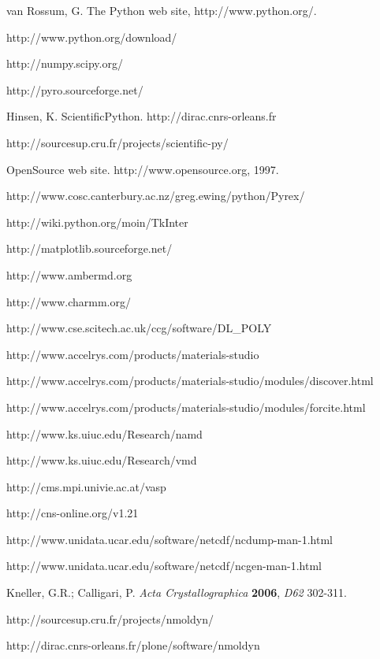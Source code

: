 \documentclass[a4paper,11pt]{article}
\begin{document}
\begin{thebibliography}{99}
 van Rossum, G. The Python web site, http://www.python.org/.

 http://www.python.org/download/

 http://numpy.scipy.org/

 http://pyro.sourceforge.net/

 Hinsen, K. ScientificPython. http://dirac.cnrs-orleans.fr  

 http://sourcesup.cru.fr/projects/scientific-py/

 OpenSource web site. http://www.opensource.org, 1997.

 http://www.cosc.canterbury.ac.nz/greg.ewing/python/Pyrex/

 http://wiki.python.org/moin/TkInter

 http://matplotlib.sourceforge.net/

 http://www.ambermd.org

 http://www.charmm.org/

 http://www.cse.scitech.ac.uk/ccg/software/DL\_POLY

 http://www.accelrys.com/products/materials-studio

 http://www.accelrys.com/products/materials-studio/modules/discover.html

 http://www.accelrys.com/products/materials-studio/modules/forcite.html

 http://www.ks.uiuc.edu/Research/namd

 http://www.ks.uiuc.edu/Research/vmd

 http://cms.mpi.univie.ac.at/vasp

 http://cns-online.org/v1.21

 http://www.unidata.ucar.edu/software/netcdf/ncdump-man-1.html

 http://www.unidata.ucar.edu/software/netcdf/ncgen-man-1.html

 Kneller, G.R.; Calligari, P. \textit{Acta Crystallographica} \textbf{2006}, \textit{D62} 302-311.

 http://sourcesup.cru.fr/projects/nmoldyn/

 http://dirac.cnrs-orleans.fr/plone/software/nmoldyn


\end{thebibliography}
\end{document}
